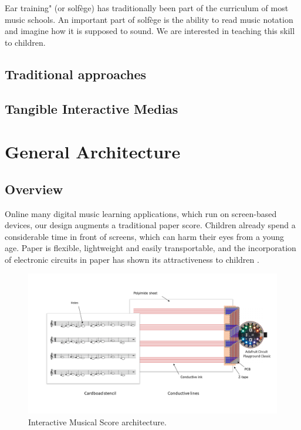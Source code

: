 Ear training" (or solfège) has traditionally been part of the curriculum of most music
schools. An important part of solfège is the ability to read music notation and imagine
how it is supposed to sound. We are interested in teaching this skill to children.

\subsection{Traditional approaches}

\subsection{Tangible Interactive Medias}

\section{General Architecture}

\subsection{Overview}

Online many digital music learning applications, which run on screen-based devices,
our design augments a traditional paper score. Children already spend a considerable
time in front of screens, which can harm their eyes from a young age. Paper is flexible,
lightweight and easily transportable, and the incorporation of electronic circuits in
paper has shown its attractiveness to children
\cite{hershman2018light}.

\begin{figure}[h]
    \centering
    \includegraphics{images/IS_schema.png}
    \caption{Interactive Musical Score architecture.}
    \label{fig:IS_schema}
\end{figure}

